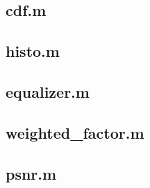 \documentclass[10pt,a4paper]{article}
\begin{document}
			\subsection{cdf.m}
				
			\subsection{histo.m}
				
			\subsection{equalizer.m}
				
			\subsection{weighted\_factor.m}
				
			\subsection{psnr.m}
				
\end{document}
